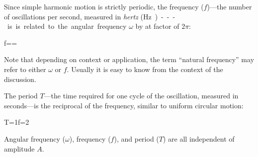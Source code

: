 Since simple harmonic motion is strictly periodic, the frequency ($f$)---the
number of oscillations per second, measured in \emph{hertz} (\si\hertz)---is
is related to the angular frequency $\omega$ by at factor of $2\pi$:
\begin{important-equation}
  f=\frac\omega{2\pi}=
\end{important-equation}
Note that depending on context or application, the term ``natural frequency''
may refer to either $\omega$ or $f$. Usually it is easy to know from the
context of the discussion.

The period $T$---the time required for one cycle of the oscillation, measured
in seconds---is the reciprocal of the frequency, similar to uniform circular
motion:
\begin{important-equation}
  T=\frac1f=2\pi{}
\end{important-equation}
Angular frequency ($\omega$), frequency ($f$), and period ($T$) are all
independent of amplitude $A$.


%      
%      

